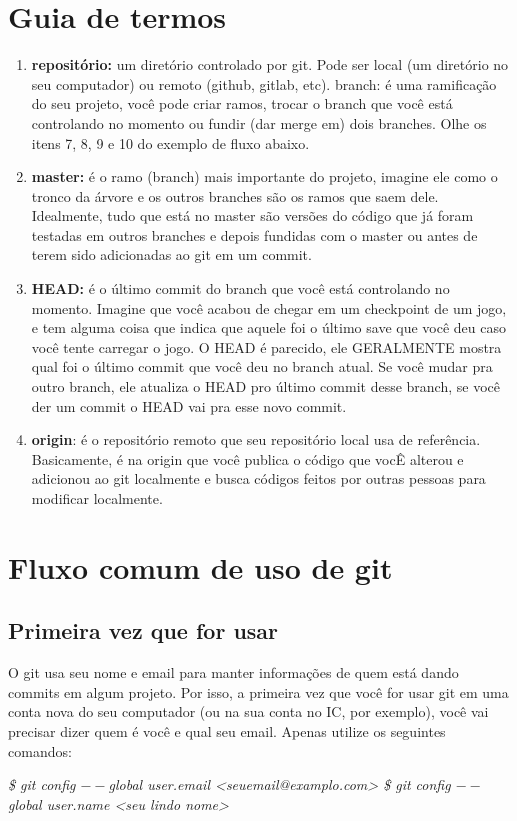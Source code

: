 \documentclass[12pt]{article}
\begin{document}
\tableofcontents

\newpage
\begin{doublespacing}

\section{Guia de termos}
\begin{enumerate}
	\item{\textbf{ repositório:} um diretório controlado por git. Pode ser local (um diretório no seu computador) ou remoto (github, gitlab, etc).}
branch: é uma ramificação do seu projeto, você pode criar ramos, trocar o branch que você está controlando no momento ou fundir (dar merge em) dois branches. Olhe os itens 7, 8, 9 e 10 do exemplo de fluxo abaixo.
\item{\textbf{master:} é o ramo (branch) mais importante do projeto, imagine ele como o tronco da árvore e os outros branches são os ramos que saem dele. Idealmente, tudo que está no master são versões do código que já foram testadas em outros branches e depois fundidas com o master ou antes de terem sido adicionadas ao git em um commit.}
	\item{\textbf{HEAD:} é o último commit do branch que você está controlando no momento. Imagine que você acabou de chegar em um checkpoint de um jogo, e tem alguma coisa que indica que aquele foi o último save que você deu caso você tente carregar o jogo. O HEAD é parecido, ele GERALMENTE mostra qual foi o último commit que você deu no branch atual. Se você mudar pra outro branch, ele atualiza o HEAD pro último commit desse branch, se você der um commit o HEAD vai pra esse novo commit.}
\item{\textbf{origin}: é o repositório remoto que seu repositório local usa de referência. Basicamente, é na origin que você publica o código que vocÊ alterou e adicionou ao git localmente e busca códigos feitos por outras pessoas para modificar localmente.}

\end{enumerate}

\section{Fluxo comum de uso de git}
\subsection{Primeira vez que for usar}
O git usa seu nome e email para manter informações de quem está dando commits em algum projeto. Por isso, a primeira vez que você for usar git em uma conta nova do seu computador (ou na sua conta no IC, por exemplo), você vai precisar dizer quem é você e qual seu email. Apenas utilize os seguintes comandos:
\begin{flushleft}
\textit{\$ git config $--$global user.email <seuemail@examplo.com> \newline
\$ git config $--$global user.name <seu lindo nome>}
\end{flushleft}


\end{doublespacing}
\end{document}

